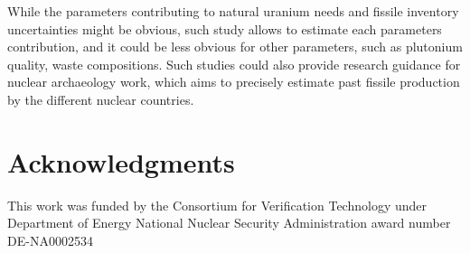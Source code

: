 \documentclass{anstrans}
\begin{document}
While the parameters contributing to natural uranium needs and fissile inventory
uncertainties might be obvious, such study allows to estimate each parameters
contribution, and it could be less obvious for other parameters, such as
plutonium quality, waste compositions.  Such studies could also provide research
guidance for nuclear archaeology work, which aims to precisely estimate past
fissile production by the different nuclear countries.




\section{Acknowledgments}
This work was funded by the Consortium for Verification Technology under
Department of Energy National Nuclear Security Administration award number
DE-NA0002534



\end{document}
